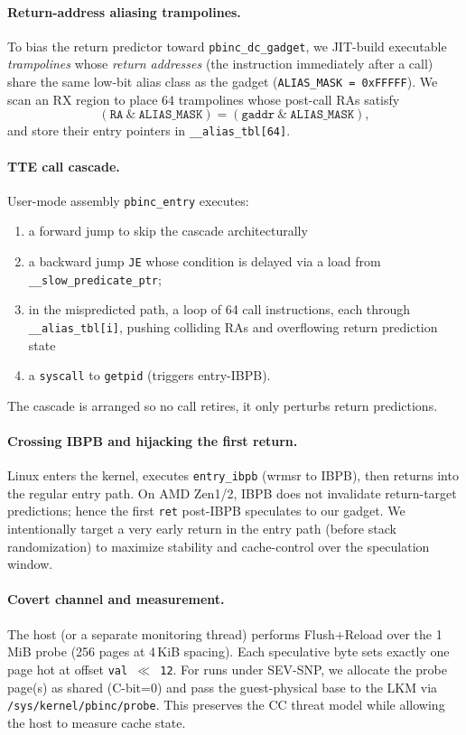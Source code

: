 \documentclass[11pt,a4paper]{article}
\begin{document}
\paragraph{Return-address aliasing trampolines.}
To bias the return predictor toward \texttt{pbinc\_dc\_gadget}, we JIT-build executable \emph{trampolines} whose \emph{return addresses} (the instruction immediately after a call) share the same low-bit alias class as the gadget (\texttt{ALIAS\_MASK = 0xFFFFF}). We scan an RX region to place 64 trampolines whose post-call RAs satisfy
\[
(\texttt{RA} \ \&\ \texttt{ALIAS\_MASK}) = (\texttt{gaddr} \ \&\ \texttt{ALIAS\_MASK}),
\]
and store their entry pointers in \texttt{\_\_alias\_tbl[64]}.

\paragraph{TTE call cascade.}
User-mode assembly \texttt{pbinc\_entry} executes:
\begin{enumerate}
  \item a forward jump to skip the cascade architecturally
  \item a backward jump \texttt{JE} whose condition is delayed via a load from \texttt{\_\_slow\_predicate\_ptr};
  \item in the mispredicted path, a loop of 64 call instructions, each through \texttt{\_\_alias\_tbl[i]}, pushing colliding RAs and overflowing return prediction state
  \item a \texttt{syscall} to \texttt{getpid} (triggers entry-IBPB).
\end{enumerate}
The cascade is arranged so no call retires, it only perturbs return predictions.

\paragraph{Crossing IBPB and hijacking the first return.}
Linux enters the kernel, executes \texttt{entry\_ibpb} (wrmsr to IBPB), then returns into the regular entry path. On AMD Zen1/2, IBPB does not invalidate return-target predictions; hence the first \texttt{ret} post-IBPB speculates to our gadget. We intentionally target a very early return in the entry path (before stack randomization) to maximize stability and cache-control over the speculation window.

\paragraph{Covert channel and measurement.}
The host (or a separate monitoring thread) performs Flush+Reload over the 1\,MiB probe (256 pages at 4\,KiB spacing). Each speculative byte sets exactly one page hot at offset \texttt{val\,$\ll$\,12}. For runs under SEV-SNP, we allocate the probe page(s) as shared (C-bit=0) and pass the guest-physical base to the LKM via \texttt{/sys/kernel/pbinc/probe}. This preserves the CC threat model while allowing the host to measure cache state.
\end{document}
